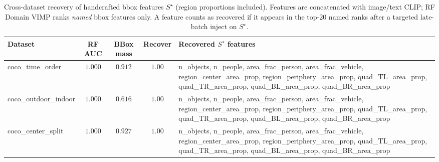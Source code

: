 
\begin{table}[ht]
\centering
\caption{Cross-dataset recovery of handcrafted bbox features $S^{\star}$ (region proportions included). Features are concatenated with image/text CLIP; RF Domain VIMP ranks \emph{named} bbox features only. A feature counts as recovered if it appears in the top-20 named ranks after a targeted late-batch inject on $S^{\star}$.}
\label{tab:bbox-named-consensus-recovery}
\small
\begin{tabular}{@{}l c c c p{6.5cm}@{}}
\toprule
Dataset & RF AUC & BBox mass & Recover & Recovered $S^{\star}$ features \\
\midrule
coco\_time\_order & $1.000$ & $0.912$ & $1.00$ & n\_objects, n\_people, area\_frac\_person, area\_frac\_vehicle, region\_center\_area\_prop, region\_periphery\_area\_prop, quad\_TL\_area\_prop, quad\_TR\_area\_prop, quad\_BL\_area\_prop, quad\_BR\_area\_prop \\
coco\_outdoor\_indoor & $1.000$ & $0.616$ & $1.00$ & n\_objects, n\_people, area\_frac\_person, area\_frac\_vehicle, region\_center\_area\_prop, region\_periphery\_area\_prop, quad\_TL\_area\_prop, quad\_TR\_area\_prop, quad\_BL\_area\_prop, quad\_BR\_area\_prop \\
coco\_center\_split & $1.000$ & $0.927$ & $1.00$ & n\_objects, n\_people, area\_frac\_person, area\_frac\_vehicle, region\_center\_area\_prop, region\_periphery\_area\_prop, quad\_TL\_area\_prop, quad\_TR\_area\_prop, quad\_BL\_area\_prop, quad\_BR\_area\_prop \\
\bottomrule
\end{tabular}
\end{table}

